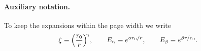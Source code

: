 
\paragraph{Auxiliary notation.}
To keep the expansions within the page width we write
\begin{equation}
\xi\equiv\Bigl(\frac{r_{0}}{r}\Bigr)^{\!\gamma},\qquad
E_{\alpha}\equiv e^{\alpha r_{0}/r},\qquad
E_{\beta}\equiv e^{\beta r/r_{0}}.
\end{equation}

\begin{subequations}

\end{subequations}
